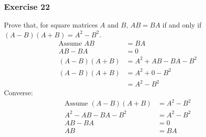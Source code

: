 \documentclass[letterpaper, 12pt]{math}
\begin{document}
\subsubsection*{Exercise 22}
Prove that, for square matrices \( A \) and \( B \), \( AB = BA \) if and only
if \( (A-B)(A+B) = A^2-B^2 \).
\begin{align*}
  \text{Assume } AB &= BA \\
  AB-BA &= 0 \\
  (A-B)(A+B) &= A^2+AB-BA-B^2 \\
  (A-B)(A+B) &= A^2+0-B^2 \\
  &= A^2-B^2
\end{align*}
Converse:
\begin{align*}
  \text{Assume } (A-B)(A+B) &= A^2-B^2 \\
  A^2-AB-BA-B^2 &= A^2-B^2 \\
  AB-BA &= 0 \\
  AB &= BA
\end{align*}
\end{document}
